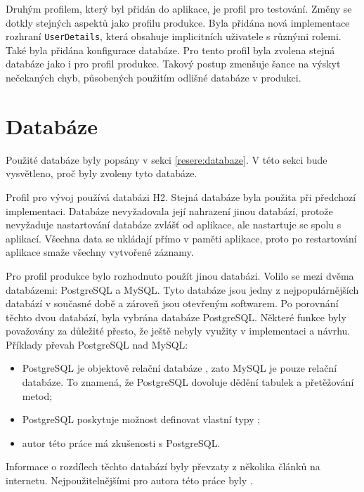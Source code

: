     Druhým profilem, který byl přidán do aplikace, je profil pro testování. Změny se dotkly stejných aspektů jako profilu produkce. Byla přidána nová implementace rozhraní \verb|UserDetails|, která obsahuje implicitních uživatele s různými rolemi. Také byla přidána konfigurace databáze. Pro tento profil byla zvolena stejná databáze jako i pro profil produkce. Takový postup zmenšuje šance na výskyt nečekaných chyb, působených použitím odlišné databáze v produkci.
    
\section{Databáze} \label{navrh:db}
    Použité databáze byly popsány v sekci \ref{resere:databaze}. V této sekci bude vysvětleno, proč byly zvoleny tyto databáze.
    
    Profil pro vývoj používá databázi H2. Stejná databáze byla použita při předchozí implementaci. Databáze nevyžadovala její nahrazení jinou databází, protože nevyžaduje nastartování databáze zvlášť od aplikace, ale nastartuje se spolu s aplikací. Všechna data se ukládají přímo v paměti aplikace, proto po restartování aplikace smaže všechny vytvořené záznamy.
    
    Pro profil produkce bylo rozhodnuto použít jinou databázi. Volilo se mezi dvěma databázemi: PostgreSQL a MySQL. Tyto databáze jsou jedny z nejpopulárnějších databází v současné době a zároveň jsou otevřeným softwarem. Po porovnání těchto dvou databází, byla vybrána databáze PostgreSQL. Některé funkce byly považovány za důležité přesto, že ještě nebyly využity v implementaci a návrhu. Příklady převah PostgreSQL nad MySQL: 
    \begin{itemize}
            \item PostgreSQL je objektově relační databáze \cite{postgres-about}, zato MySQL je pouze relační databáze\cite{mysql-wiki}. To znamená, že PostgreSQL dovoluje dědění tabulek a přetěžování metod;
            \item PostgreSQL poskytuje možnost definovat vlastní typy \cite{pstgres-create-type};
            \item autor této práce má zkušenosti s PostgreSQL.
    \end{itemize}
    Informace o rozdílech těchto databází byly převzaty z několika článků na internetu. Nejpoužitelnějšími pro autora této práce byly \cite{mysql-postgres1, mysql-postgres2}.
    
